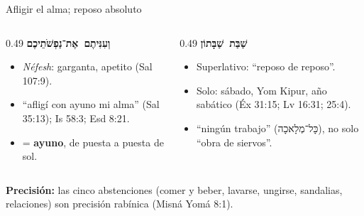 \documentclass[hyperref={bookmarks=false},aspectratio=169]{beamer}
\newcommand{\heb}[1]{\mbox{\foreignlanguage{hebrew}{#1}}}
\newcommand{\destacar}[1]{\textbf{\textcolor{tierraroja}{#1}}}
\newcommand{\precision}[1]{{\footnotesize\color{sepia}\textbf{Precisión:} #1}}
\begin{document}
\begin{frame}{Afligir el alma; reposo absoluto}
\begin{columns}[t,onlytextwidth]
\begin{column}{0.49\textwidth}\small
\destacar{\heb{וְעִנִּיתֶם אֶת־נַפְשֹׁתֵיכֶם}}
\begin{itemize}
\item \emph{Néfesh}: garganta, apetito (Sal 107:9).
\item ``afligí con ayuno mi alma'' (Sal 35:13); Is 58:3; Esd 8:21.
\item = \destacar{ayuno}, de puesta a puesta de sol.
\end{itemize}
\end{column}
\begin{column}{0.49\textwidth}\small
\destacar{\heb{שַׁבַּת שַׁבָּתוֹן}}
\begin{itemize}
\item Superlativo: ``reposo de reposo''.
\item Solo: sábado, Yom Kipur, año sabático (Éx 31:15; Lv 16:31; 25:4).
\item ``ningún trabajo'' (\heb{כָּל־מְלָאכָה}), no solo ``obra de siervos''.
\end{itemize}
\end{column}
\end{columns}\par\medskip
\precision{las cinco abstenciones (comer y beber, lavarse, ungirse, sandalias, relaciones) son precisión rabínica (Misná Yomá 8:1).}
\end{frame}
\end{document}

